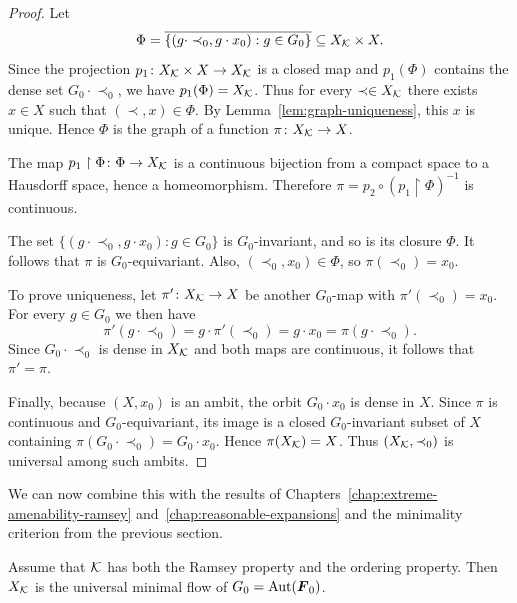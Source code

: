 \begin{proof}
    Let
    \[
        \Phi
        =
        \overline{\{(g\cdot \prec_0,g\cdot x_0):g\in G_0\}}
        \subseteq X_{\mathcal{K}}\times X.
    \]
    Since the projection \(p_1\colon X_{\mathcal{K}}\times X\to X_{\mathcal{K}}\)
    is a closed map and \(p_1(\Phi)\) contains the dense set
    \(G_0\cdot \prec_0\),
    we have
    \(p_1(\Phi)=X_{\mathcal{K}}\). Thus for every \(\prec\in X_{\mathcal{K}}\) there exists
    \(x\in X\) such that \((\prec,x)\in \Phi\).
    By Lemma~\ref{lem:graph-uniqueness}, this \(x\) is unique. Hence \(\Phi\) is the graph of a function
    \(\pi\colon X_{\mathcal{K}}\to X\).

    The map
    \(p_1\restriction \Phi\colon \Phi\to X_{\mathcal{K}}\)
    is a continuous bijection from a compact space to a Hausdorff space, hence a homeomorphism. Therefore
    \(\pi=p_2\circ (p_1\restriction \Phi)^{-1}\)
    is continuous.

    The set
    \(\{(g\cdot \prec_0,g\cdot x_0):g\in G_0\}\)
    is \(G_0\)-invariant, and so is its closure \(\Phi\). It follows that \(\pi\) is \(G_0\)-equivariant. Also,
    \((\prec_0,x_0)\in \Phi\),
    so
    \(\pi(\prec_0)=x_0\).

    To prove uniqueness, let
    \(\pi'\colon X_{\mathcal{K}}\to X\)
    be another \(G_0\)-map with
    \(\pi'(\prec_0)=x_0\).
    For every \(g\in G_0\) we then have
    \[
        \pi'(g\cdot \prec_0)
        =g\cdot \pi'(\prec_0)
        =g\cdot x_0
        =\pi(g\cdot \prec_0).
    \]
    Since \(G_0\cdot \prec_0\)
    is dense in \(X_{\mathcal{K}}\) and both maps are continuous, it follows that
    \(\pi'=\pi\).

    Finally, because \((X,x_0)\) is an ambit, the orbit
    \(G_0\cdot x_0\)
    is dense in \(X\). Since \(\pi\) is continuous and \(G_0\)-equivariant, its image is a closed \(G_0\)-invariant subset of \(X\) containing
    \(\pi(G_0\cdot \prec_0)=G_0\cdot x_0\).
    Hence
    \(\pi(X_{\mathcal{K}})=X\).
    Thus \((X_{\mathcal{K}},\prec_0)\) is universal among such ambits.
\end{proof}

We can now combine this with the results of Chapters~\ref{chap:extreme-amenability-ramsey} and~\ref{chap:reasonable-expansions} and the minimality criterion from the previous section.

\begin{corollary}
    \label{cor:ramsey-ordering-umf}
    Assume that \(\mathcal{K}\) has both the Ramsey property and the ordering property. Then \(X_{\mathcal{K}}\) is the universal minimal flow of \(G_0=\operatorname{Aut}(\boldsymbol{F}_0)\).
\end{corollary}


